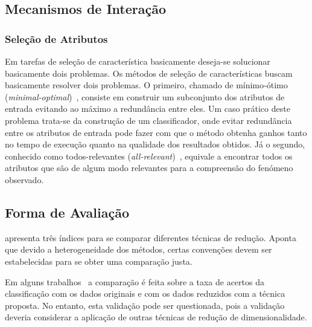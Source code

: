 \subsection{Mecanismos de Interação}

\subsubsection{Seleção de Atributos}

Em tarefas de seleção de característica basicamente deseja-se solucionar basicamente dois problemas. 
Os métodos de seleção de características buscam basicamente resolver dois problemas. 
O primeiro, chamado de mínimo-ótimo (\emph{minimal-optimal})~\cite{Kohavi1997}, consiste em construir um subconjunto dos atributos de entrada evitando ao máximo a redundância entre eles. 
Um caso prático deste problema trata-se da construção de um classificador, onde evitar redundância entre os atributos de entrada pode fazer com que o método obtenha ganhos tanto no tempo de execução quanto na qualidade dos resultados obtidos. 
Já o segundo, conhecido como todos-relevantes (\emph{all-relevant})~\cite{Nilsson2007}, equivale a encontrar todos os atributos que são de algum modo relevantes para a compreensão do fenómeno observado. 


\subsection{Forma de Avaliação}


\cite{Medeiros2011} apresenta três índices para se comparar diferentes técnicas de redução. Aponta que devido a heterogeneidade dos métodos, certas convenções devem ser estabelecidas para se obter uma comparação justa.

Em alguns trabalhos~\cite{Joshi2007} a comparação é feita sobre a taxa de acertos da classificação com os dados originais e com os dados reduzidos com a técnica proposta. No entanto, esta validação pode ser questionada, pois a validação deveria considerar a aplicação de outras técnicas de redução de dimensionalidade. 


